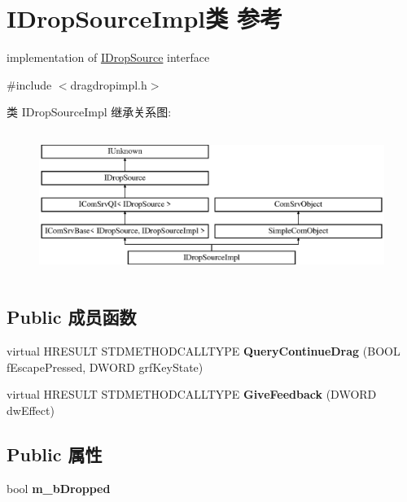 \hypertarget{class_i_drop_source_impl}{}\section{I\+Drop\+Source\+Impl类 参考}
\label{class_i_drop_source_impl}


implementation of \hyperlink{interface_i_drop_source}{I\+Drop\+Source} interface  




{\ttfamily \#include $<$dragdropimpl.\+h$>$}

类 I\+Drop\+Source\+Impl 继承关系图\+:\begin{figure}[H]
\begin{center}
\leavevmode
\includegraphics[height=4.745763cm]{class_i_drop_source_impl}
\end{center}
\end{figure}
\subsection*{Public 成员函数}
\begin{DoxyCompactItemize}
\item 
\mbox{\label{class_i_drop_source_impl_aa45a58837eb2bbe4625deefafd4305de}} 
virtual H\+R\+E\+S\+U\+LT S\+T\+D\+M\+E\+T\+H\+O\+D\+C\+A\+L\+L\+T\+Y\+PE {\bfseries Query\+Continue\+Drag} (B\+O\+OL f\+Escape\+Pressed, D\+W\+O\+RD grf\+Key\+State)
\item 
\mbox{\label{class_i_drop_source_impl_a6f6d1ee651605e84e8f3cffd604fd8a1}} 
virtual H\+R\+E\+S\+U\+LT S\+T\+D\+M\+E\+T\+H\+O\+D\+C\+A\+L\+L\+T\+Y\+PE {\bfseries Give\+Feedback} (D\+W\+O\+RD dw\+Effect)
\end{DoxyCompactItemize}
\subsection*{Public 属性}
\begin{DoxyCompactItemize}
\item 
\mbox{\label{class_i_drop_source_impl_ab5880da1d6dbbb745ac0fa79a84c3ab5}} 
bool {\bfseries m\+\_\+b\+Dropped}
\end{DoxyCompactItemize}
